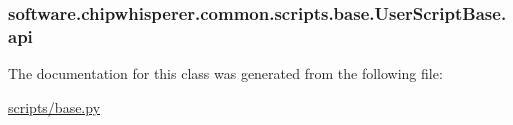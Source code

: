 \subsubsection[{api}]{\setlength{\rightskip}{0pt plus 5cm}software.\+chipwhisperer.\+common.\+scripts.\+base.\+User\+Script\+Base.\+api}\label{classsoftware_1_1chipwhisperer_1_1common_1_1scripts_1_1base_1_1UserScriptBase_a49ac32dfc7c50f6b50344f34630215a4}


The documentation for this class was generated from the following file\+:\begin{DoxyCompactItemize}
\item 
\hyperlink{scripts_2base_8py}{scripts/base.\+py}\end{DoxyCompactItemize}
